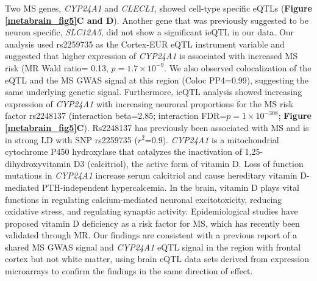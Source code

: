 Two MS genes, \textit{CYP24A1} and \textit{CLECL1}, showed cell-type specific eQTLs (\textbf{Figure \ref{metabrain_fig5}C and D}). Another gene that was previously suggested to be neuron specific\cite{internationalmultiplesclerosisgeneticsGeneticRiskPrimary2011}, \textit{SLC12A5}, did not show a significant ieQTL in our data. Our analysis used rs2259735 as the Cortex-EUR eQTL instrument variable and suggested that higher expression of \textit{CYP24A1} is associated with increased MS risk (MR Wald ratio= 0.13, $p=1.7 \times 10^{-9}$. We also observed colocalization of the eQTL and the MS GWAS signal at this region (Coloc PP4=0.99), suggesting the same underlying genetic signal. Furthermore, ieQTL analysis showed increasing expression of \textit{CYP24A1} with increasing neuronal proportions for the MS risk factor rs2248137 (interaction beta=2.85; interaction FDR=$p=1 \times 10^{-308}$; \textbf{Figure \ref{metabrain_fig5}C}). Rs2248137 has previously been associated with MS\cite{consortiumMultipleSclerosisGenomic2019} and is in strong LD with SNP rs2259735 ($r^{2}$=0.9). \textit{CYP24A1} is a mitochondrial cytochrome P450 hydroxylase that catalyzes the inactivation of 1,25-dihydroxyvitamin D3 (calcitriol), the active form of vitamin D\cite{jones25HydroxyvitaminD24hydroxylaseCYP24A12012}. Loss of function mutations in \textit{CYP24A1} increase serum calcitriol and cause hereditary vitamin D-mediated PTH-independent hypercalcemia\cite{schlingmannMutationsCYP24A1Idiopathic2011,cappellaniHereditaryHypercalcemiaCaused2019}. In the brain, vitamin D plays vital functions in regulating calcium-mediated neuronal excitotoxicity, reducing oxidative stress, and regulating synaptic activity\cite{mpandzouVitaminDeficiencyIts2016}. Epidemiological studies have proposed vitamin D deficiency as a risk factor for MS\cite{agnelloCYP27A1CYP24A1RXRalpha2018,pierrot-deseillignyHypovitaminosisOneEnvironmental2010}, which has recently been validated through MR\cite{rheadMendelianRandomizationShows2016,jacobsBMILowVitamin2020,jiangCausalRoleCirculating2021}.  Our findings are consistent with a previous report of a shared MS GWAS signal and \textit{CYP24A1} eQTL signal in the region with frontal cortex but not white matter, using brain eQTL data sets derived from expression microarrays to confirm the findings in the same direction of effect\cite{ramasamyGeneticEvidencePathogenic2014}.  

